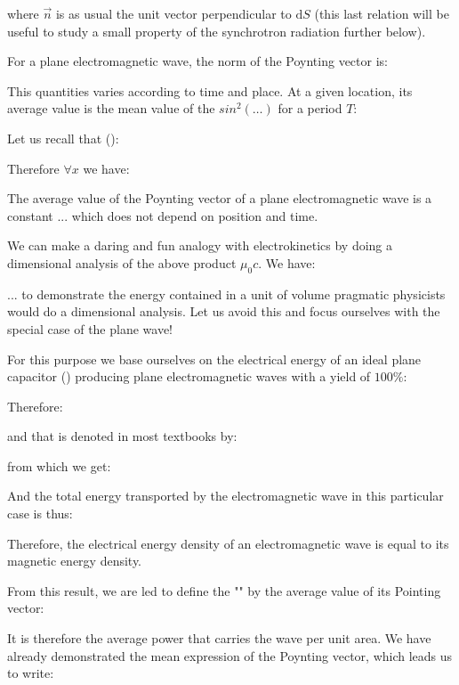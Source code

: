 	where $\vec{n}$ is as usual the unit vector perpendicular to $\mathrm{d}S$ (this last relation will be useful to study a small property of the synchrotron radiation further below).

	For a plane electromagnetic wave, the norm of the Poynting vector is:
	
	This quantities varies according to time and place. At a given location, its average value is the mean value of the $sin^2(\ldots)$ for a period $T$:
	
	Let us recall that ():
	
	Therefore $\forall x$ we have:
	
	The average value of the Poynting vector of a plane electromagnetic wave is a constant ... which does not depend on position and time.
	
	\begin{tcolorbox}[title=Remark,colframe=black,arc=10pt]
	We can make a daring and fun analogy with electrokinetics by doing a dimensional analysis of the above product $\mu_0c$. We have:
	
	\end{tcolorbox}
	... to demonstrate the energy contained in a unit of volume pragmatic physicists would do a dimensional analysis. Let us avoid this and focus ourselves with the special case of the plane wave!

	For this purpose we base ourselves on the electrical energy of an ideal plane capacitor () producing plane electromagnetic waves with a yield of $100\%$:
	
	Therefore:
	
	and that is denoted in most textbooks by:
	
	from which we get:
	
	And the total energy transported by the electromagnetic wave in this particular case is thus:
	
	Therefore, the electrical energy density of an electromagnetic wave is equal to its magnetic energy density.

	From this result, we are led to define the "" by the average value of its Pointing vector:
	
	It is therefore the average power that carries the wave per unit area. We have already demonstrated the mean expression of the Poynting vector, which leads us to write:
	

